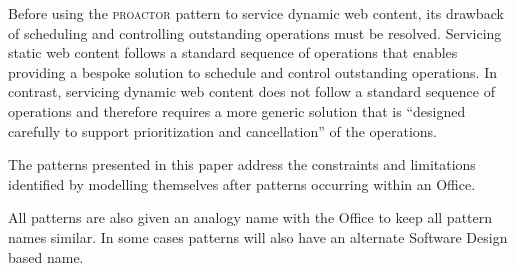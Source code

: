 \documentclass[prodmode]{style/acmlarge}
\begin{document}
Before using the \textsc{proactor} pattern to service dynamic web content, its
drawback of scheduling and controlling outstanding operations \cite[p.
8]{proactor} must be resolved.  Servicing static web content follows a standard
sequence of operations that enables providing a bespoke solution to schedule and
control outstanding operations.  In contrast, servicing dynamic web content does
not follow a standard sequence of operations and therefore requires a more
generic solution that is ``designed carefully to support prioritization and
cancellation'' \cite[p. 8]{proactor} of the operations.

The patterns presented in this paper address the constraints and limitations
identified by modelling themselves after patterns occurring within an Office.

All patterns are also given an analogy name with the Office to keep all pattern
names similar.  In some cases patterns will also have an alternate Software
Design based name.




\end{document}
